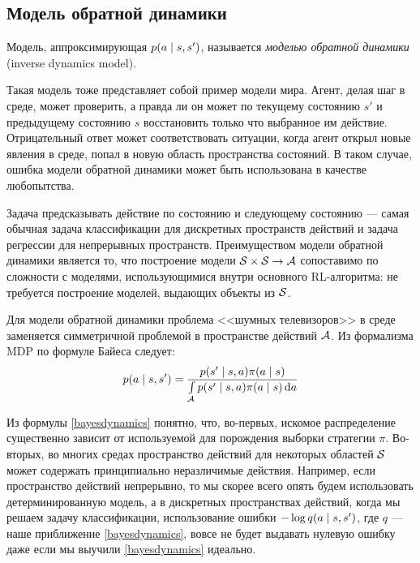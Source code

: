 \subsection{Модель обратной динамики}

\begin{definition}
Модель, аппроксимирующая $p(a \HM\mid s, s')$, называется \emph{моделью обратной динамики} (inverse dynamics model).
\end{definition}

Такая модель тоже представляет собой пример модели мира. Агент, делая шаг в среде, может проверить, а правда ли он может по текущему состоянию $s'$ и предыдущему состоянию $s$ восстановить только что выбранное им действие. Отрицательный ответ может соответствовать ситуации, когда агент открыл новые явления в среде, попал в новую область пространства состояний. В таком случае, ошибка модели обратной динамики может быть использована в качестве любопытства.

Задача предсказывать действие по состоянию и следующему состоянию --- самая обычная задача классификации для дискретных пространств действий и задача регрессии для непрерывных пространств. Преимуществом модели обратной динамики является то, что построение модели $\St \HM\times \St \HM\to \A$ сопоставимо по сложности с моделями, использующимися внутри основного RL-алгоритма: не требуется построение моделей, выдающих объекты из $\mathcal{S}$.

Для модели обратной динамики проблема <<шумных телевизоров>> в среде заменяется симметричной проблемой в пространстве действий $\mathcal{A}$. Из формализма MDP по формуле Байеса следует:
\begin{equation}\label{bayesdynamics}
p(a \mid s, s') = \frac{p(s' \mid s, a)\pi(a \mid s)}{\int\limits_{\mathcal{A}} p(s' \mid s, a)\pi(a \mid s) \mathop{}\!\mathrm{d} a}
\end{equation}

Из формулы \eqref{bayesdynamics} понятно, что, во-первых, искомое распределение существенно зависит от используемой для порождения выборки стратегии $\pi$. Во-вторых, во многих средах пространство действий для некоторых областей $\mathcal{S}$ может содержать принципиально неразличимые действия. Например, если пространство действий непрерывно, то мы скорее всего опять будем использовать детерминированную модель, а в дискретных пространствах действий, когда мы решаем задачу классификации, использование ошибки $-\log q(a \HM\mid s, s')$, где $q$ --- наше приближение \eqref{bayesdynamics}, вовсе не будет выдавать нулевую ошибку даже если мы выучили \eqref{bayesdynamics} идеально.

